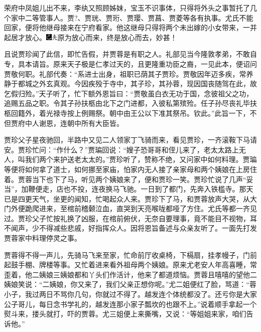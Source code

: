 荣府中凤姐儿出不来，李纨又照顾姊妹，宝玉不识事体，只得将外头之事暂托了几个家中二等管事人。贾?、贾珖、贾珩、贾璎、贾菖、贾菱等各有执事。尤氏不能回家，便将他继母接来在宁府看家。他这继母只得将两个未出嫁的小女带来，一并起居才放心。{\includegraphics[width=3mm]{../Images/00003}\includegraphics[width=3mm]{../Images/00012}\footnotesize \kaishu 原为放心而来，终是放心而去，妙甚！}

且说贾珍闻了此信，即忙告假，并贾蓉是有职之人。礼部见当今隆敦孝弟，不敢自专，具本请旨。原来天子极是仁孝过天的，且更隆重功臣之裔，一见此本，便诏问贾敬何职。礼部代奏：``系进士出身，祖职已荫其子贾珍。贾敬因年迈多疾，常养静于都城之外玄真观。今因疾殁于寺中，其子珍，其孙蓉，现因国丧随驾在此，故乞假归殓。''天子听了，忙下额外恩旨曰：``贾敬虽白衣无功于国，念彼祖父之功，追赐五品之职。令其子孙扶柩由北下之门进都，入彼私第殡殓。任子孙尽丧礼毕扶柩回籍外，着光禄寺按上例赐祭。朝中由王公以下准其祭吊。钦此。''此旨一下，不但贾府中人谢恩，连朝中所有大臣皆。

贾珍父子星夜驰回，半路中又见二人领家丁飞骑而来，看见贾珍，一齐滚鞍下马请安。贾珍忙问：``作什么？''贾㻞回说：``嫂子恐哥哥和侄儿来了，老太太路上无人，叫我们两个来护送老太太的。''贾珍听了，赞称不绝，又问家中如何料理。贾㻞等便将如何拿了道士，如何挪至家庙，怕家内无人接了亲家母和两个姨娘在上房住着。贾蓉当下也下了马，听见两个姨娘来了，便和贾珍一笑。贾珍忙说了几声``妥当''，加鞭便走，店也不投，连夜换马飞驰。一日到了都门，先奔入铁槛寺。那天已是四更天气，坐更的闻知，忙喝起众人来。贾珍下了马，和贾蓉放声大哭，从大门外便跪爬进来，至棺前稽颡泣血，直哭到天亮喉咙都哑了方住。尤氏等都一齐见过。贾珍父子忙按礼换了凶服，在棺前俯伏，无奈自要理事，竟不能目不视物，耳不闻声，少不得减些悲戚，好指挥众人。因将恩旨备述与众亲友听了。一面先打发贾蓉家中料理停灵之事。

贾蓉得不得一声儿，先骑马飞来至家，忙命前厅收桌椅，下槅扇，挂孝幔子，门前起鼓手棚、牌楼等事。又忙着进来看外祖母两个姨娘。原来尤老安人年高喜睡，常歪着，他二姨娘三姨娘都和丫头们作活计，他来了都道烦恼。贾蓉且嘻嘻的望他二姨娘笑说：``二姨娘，你又来了，我们父亲正想你呢。''尤二姐便红了脸，骂道：``蓉小子，我过两日不骂你几句，你就过不得了。越发连个体统都没了。还亏你是大家公子哥儿，每日念书学礼的，越发连那小家子瓢坎的也跟不上。''说着顺手拿起一个熨斗来，搂头就打，吓的贾蓉。尤三姐便上来撕嘴，又说：``等姐姐来家，咱们告诉他。''

